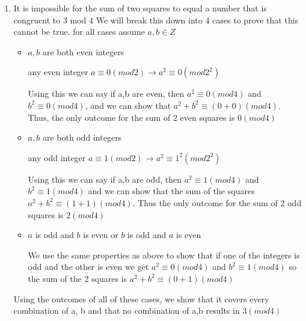 \documentclass[12pt]{article}
\begin{document}
\begin{enumerate}
  \item It is impossible for the sum of two squares to equal a number that is congruent to 3 mod 4
    We will break this down into 4 cases to prove that this cannot be true.
    for all cases assume $a,b \in Z$
    \begin{itemize}
      \item $a,b$ are both even integers
        \par any even integer $ a \equiv 0 (mod 2) \rightarrow a^2 \equiv 0 (mod 2^2)$
        \par Using this we can say if a,b are even, then $a^2 \equiv 0 (mod 4)$ and $b^2 \equiv 0 (mod 4)$, and we can show that $a^2 + b^2 \equiv (0 + 0) (mod 4)$.  Thus, the only outcome for the sum of 2 even squares is $0 (mod 4)$
      \item $a,b$ are both odd integers
        \par any odd integer $a \equiv 1 (mod 2) \rightarrow a^2 \equiv 1^2 (mod 2^2)$
        \par Using this we can say if a,b are odd, then $a^2 \equiv 1 (mod 4)$ and $b^2 \equiv 1 (mod 4) $ and we can show that the sum of the squares $ a^2 + b^2 \equiv (1+1) (mod 4)$.  Thus the only outcome for the sum of 2 odd squares is $2 (mod 4)$
      \item $a$ is odd and $b$ is even or $b$ is odd and $a$ is even
        \par We use the same properties as above to show that  if one of the integers is odd and the other is even we get $a^2 \equiv 0 (mod 4)$ and $b^2 \equiv 1(mod 4)$ so the sum of the 2 squares is $a^2 + b^2 \equiv (0 + 1)(mod 4)$
    \end{itemize}
      Using the outcomes of all of these cases, we show that it covers every combination of a, b and that no combination of a,b results in $3 (mod 4)$

\end{enumerate}
\end{document}

